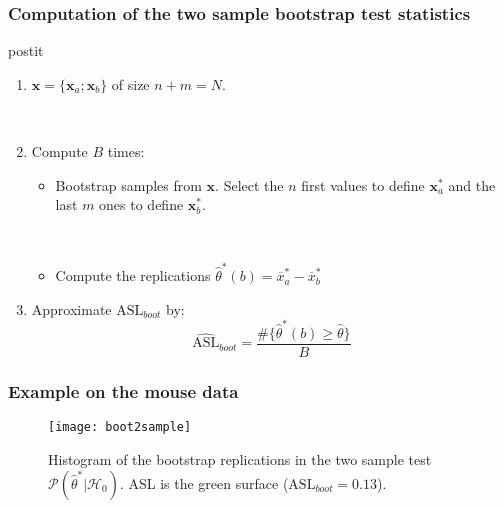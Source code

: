 \frame
{
\frametitle{Computation of the two sample bootstrap test statistics}

\begin{beamercolorbox}[wd=\linewidth, rounded=true,shadow=true]{postit}

\begin{enumerate}
\item $\mathbf{x}=\lbrace \mathbf{x}_a;\mathbf{x}_b \rbrace$ of size $n+m=N$. 

\
\item Compute $B$ times:

\begin{itemize}
\item Bootstrap samples from  $\mathbf{x}$. Select the $n$ first values to define $\mathbf{x}^{*}_a$ and the last $m$ ones to define $\mathbf{x}^{*}_b$.

\

\item Compute the replications $\hat{\theta}^{*}(b)=\overline{x}_{a}^{*}-\overline{x}_{b}^{*}$
\end{itemize}

\item Approximate $\mathrm{ASL}_{boot}$ by:
$$
\widehat{\mathrm{ASL}}_{boot}= \frac{\# \lbrace \hat{\theta}^{*}(b) \geq \hat{\theta} \rbrace}{B}
$$
\end{enumerate}

\end{beamercolorbox}

}
\frame
{
\frametitle{Example on the mouse data}

\begin{figure}[!h]
\texttt{[image: boot2sample]}
\caption{Histogram of the \alert{bootstrap replications in the two sample test $\mathcal{P}(\hat{\theta}^{*}|\mathcal{H}_{0})$}. ASL is the green surface ($\mathrm{ASL}_{boot}=0.13$).}
\end{figure}

}

